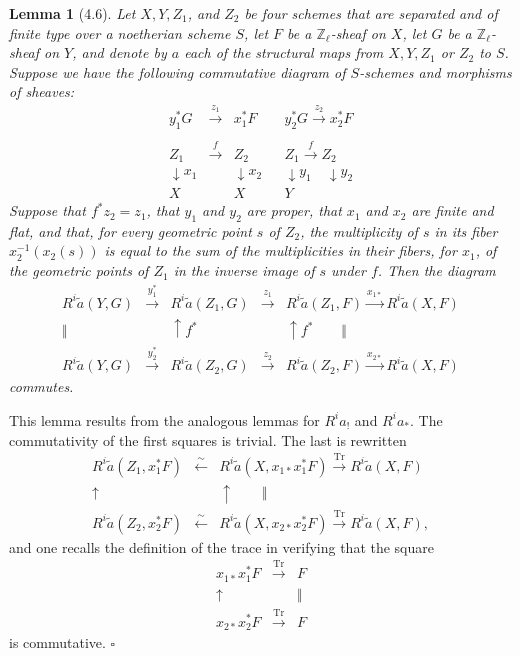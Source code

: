 \documentclass[10pt]{article}
\newcommand{\Z}{\mathbb Z}
\newcommand{\Tr}{\operatorname{Tr}}
\newcommand{\QED}{\hfill$\square$}
\newtheorem*{lemma}{Lemma}
\begin{document}
\begin{lemma}[4.6]
Let $X,Y,Z_1$, and $Z_2$ be four schemes that are separated and of finite type over a noetherian scheme $S$, let $F$ be a $\Z_\ell$-sheaf on $X$, let $G$ be a $\Z_\ell$-sheaf on $Y$, and denote by $a$ each of the structural maps from $X,Y,Z_1$ or $Z_2$ to $S$. Suppose we have the following commutative diagram of $S$-schemes and morphisms of sheaves:
\[
\begin{array}{ccccc}
y_1^*G&\xrightarrow{z_1}&x_1^*F&&y_2^*G\xrightarrow{z_2}x_2^*F\\
&&&&\\[-1em]
Z_1&\xrightarrow{f}&Z_2&&Z_1\xrightarrow{f}Z_2\\[-0.2em]
\downarrow x_1&&\downarrow x_2&&\downarrow y_1\quad\downarrow y_2\\[-0.2em]
X&&X&&Y
\end{array}
\]
Suppose that $f^*z_2=z_1$, that $y_1$ and $y_2$ are proper, that $x_1$ and $x_2$ are finite and flat, and that, for every geometric point $s$ of $Z_2$, the multiplicity of $s$ in its fiber $x_2^{-1}(x_2(s))$ is equal to the sum of the multiplicities in their fibers, for $x_1$, of the geometric points of $Z_1$ in the inverse image of $s$ under $f$. Then the diagram
\[
\begin{array}{ccccc}
R^i\widetilde a(Y,G)&\xrightarrow{y_1^*}&R^i\widetilde a(Z_1,G)&\xrightarrow{z_1}&R^i\widetilde a(Z_1,F)\xrightarrow{x_{1*}}R^i\widetilde a(X,F)\\
\Vert&&\uparrow f^*&&\uparrow f^*\qquad\Vert\\
R^i\widetilde a(Y,G)&\xrightarrow{y_2^*}&R^i\widetilde a(Z_2,G)&\xrightarrow{z_2}&R^i\widetilde a(Z_2,F)\xrightarrow{x_{2*}}R^i\widetilde a(X,F)
\end{array}
\]
commutes.
\end{lemma}

This lemma results from the analogous lemmas for $R^ia_!$ and $R^ia_*$. The commutativity of the first squares is trivial. The last is rewritten
\[
\begin{array}{ccc}
R^i\widetilde a(Z_1,x_1^*F)&\xleftarrow{\sim}&R^i\widetilde a(X,x_{1*}x_1^*F)\xrightarrow{\Tr}R^i\widetilde a(X,F)\\
\uparrow&&\uparrow\qquad\Vert\\
R^i\widetilde a(Z_2,x_2^*F)&\xleftarrow{\sim}&R^i\widetilde a(X,x_{2*}x_2^*F)\xrightarrow{\Tr}R^i\widetilde a(X,F),
\end{array}
\]
and one recalls the definition of the trace in verifying that the square
\[
\begin{array}{ccc}
x_{1*}x_1^*F&\xrightarrow{\Tr}&F\\
\uparrow&&\Vert\\
x_{2*}x_2^*F&\xrightarrow{\Tr}&F
\end{array}
\]
is commutative. \QED
\end{document}

